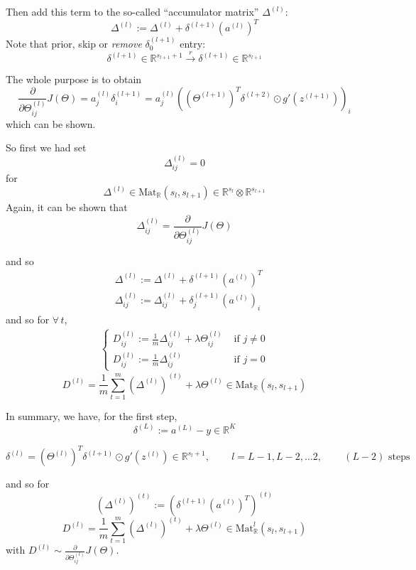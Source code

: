 \documentclass[10pt]{amsart}
\begin{document}
\begin{multicols*}{2}
Then add this term to the so-called ``accumulator matrix'' $\Delta^{(l)}$:
\[
\Delta^{(l)} := \Delta^{(l)} + \delta^{(l+1)} (a^{(l)})^T
\]
Note that prior, skip or \emph{remove} $\delta_0^{(l+1)}$ entry:
\[
\delta^{(l+1)} \in \mathbb{R}^{ s_{l+1} + 1} \xrightarrow{ r} \delta^{(l+1)} \in \mathbb{R}^{s_{l+1} }
\]

The whole purpose is to obtain
\[
\frac{ \partial }{ \partial \Theta^{(l)}_{ij} } J(\Theta) = a_j^{(l)} \delta_i^{(l+1)} = a_j^{(l)} ( (\Theta^{(l+1)})^T \delta^{(l+2)} \odot g'(z^{(l+1)}) )_i  
\]
which can be shown.

So first we had set
\[
\Delta_{ij}^{(l)} = 0 
\]
for
\[
\Delta^{(l)} \in \text{Mat}_{\mathbb{R}}(s_l, s_{l+1} ) \in \mathbb{R}^{s_l} \otimes \mathbb{R}^{s_{l+1}} 
\]
Again, it can be shown that 
\begin{equation}
  \Delta_{ij}^{(l)} = \frac{ \partial }{ \partial \Theta^{(l)}_{ij} } J(\Theta)
  \end{equation}

and so
\[
\begin{aligned}
 & \Delta^{(l)} := \Delta^{(l)} + \delta^{(l+1)} (a^{(l)})^T \\ 
 & \Delta^{(l)}_{ij} := \Delta^{(l)}_{ij} + \delta^{(l+1)}_j (a^{(l)})_i 
\end{aligned}
\]
and so for $\forall \, t$,
\[
\begin{aligned}
\begin{cases}   D_{ij}^{(l)} := \frac{1}{m} \Delta_{ij}^{(l)} + \lambda \Theta_{ij}^{(l)} & \text{ if } j \neq 0 \\
  D_{ij}^{(l)} := \frac{1}{m} \Delta_{ij}^{(l)} & \text{ if } j = 0 \end{cases}
  \end{aligned}
\]
\[
D^{(l)} = \frac{1}{m} \sum_{t=1}^m (\Delta^{(l)})^{(t)} + \lambda \Theta^{(l)} \in \text{Mat}_{\mathbb{R}}(s_l,s_{l+1})
\]


In summary, we have, for the first step,
\begin{equation}
  \delta^{(L)} := a^{(L)} - y \in \mathbb{R}^K
  \end{equation}

\begin{equation}
  \delta^{(l)} = (\Theta^{(l)})^T \delta^{(l+1)} \odot g'(z^{(l)}) \in \mathbb{R}^{s_l + 1} , \qquad \, l = L-1,L-2, \dots 2, \qquad \, (L-2) \text{ steps } 
  \end{equation}

and so for
\begin{equation}
(\Delta^{(l)})^{(t)} := (\delta^{(l+1)}(a^{(l)})^T)^{(t)}
\end{equation}
\begin{equation}
D^{(l)} = \frac{1}{m} \sum_{t=1}^m (\Delta^{(l)})^{(t)}  + \lambda \Theta^{(l)} \in \text{Mat}^l_{\mathbb{R}}(s_l,s_{l+1})
\end{equation}
with $D^{(l)} \sim \frac{ \partial }{ \partial \Theta_{ij}^{(l)} } J(\Theta)$.


\end{multicols*}
\end{document}
